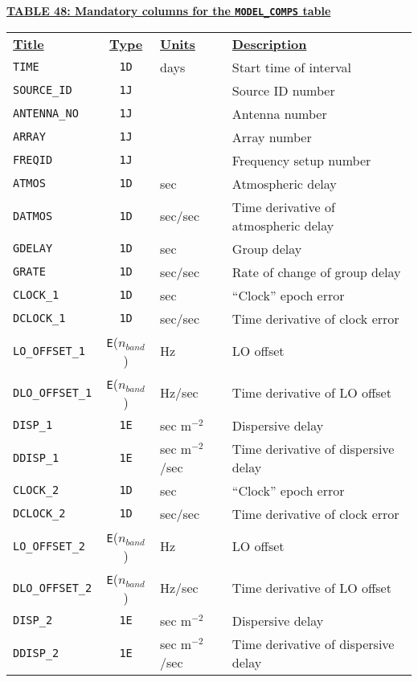 \documentclass[twoside]{article}
\newcommand{\Me}[1]{\textcolor{mecol}{#1}}
\newcommand{\nband}{$n_{band}$}
\begin{document}
\begin{center}
\underline{\bf{TABLE 48: Mandatory columns for the {\tt MODEL\_COMPS}
    table}}\\
\begin{tabular}{lcll}
\noalign{\vspace{2pt}}
\underline{{\bf Title\vphantom{y}}} & \underline{\bf{Type}} &
   \underline{{\bf Units\vphantom{y}}} & \underline{\bf{Description}} \\
\noalign{\vspace{2pt}}
{\tt TIME}        & {\tt 1D} & days  & \Me{Start} time of interval \\
{\tt SOURCE\_ID}  & {\tt 1J} &       & Source ID number \\
{\tt ANTENNA\_NO} & {\tt 1J} &       & Antenna number \\
{\tt ARRAY}       & {\tt 1J} &       & Array number \\
{\tt FREQID}      & {\tt 1J} &       & Frequency setup number \\
{\tt ATMOS}       & {\tt 1D} & sec   & Atmospheric delay \\
{\tt DATMOS}      & {\tt 1D} & sec/sec & Time derivative of
                                       atmospheric delay \\
{\tt GDELAY}      & {\tt 1D} & sec   & Group delay \\
{\tt GRATE}       & {\tt 1D} & sec/sec & Rate of change of group delay \\
{\tt CLOCK\_1}    & {\tt 1D} & sec   & ``Clock'' epoch error \\
{\tt DCLOCK\_1}   & {\tt 1D} & sec/sec & Time derivative of clock error \\
{\tt LO\_OFFSET\_1} & {\tt E}(\nband) & Hz & LO offset \\
{\tt DLO\_OFFSET\_1} & {\tt E}(\nband) & Hz/sec & Time derivative of
                                        LO offset \\
{\tt DISP\_1}     & {\tt 1E} & sec \Me{m$^{-2}$} & Dispersive delay \\
{\tt DDISP\_1}    & {\tt 1E} & sec \Me{m$^{-2}$}/sec & Time derivative of dispersive
                                        delay \\
\hline
{\tt CLOCK\_2}    & {\tt 1D} & sec   & ``Clock'' epoch error \\
{\tt DCLOCK\_2}   & {\tt 1D} & sec/sec & Time derivative of clock error \\
{\tt LO\_OFFSET\_2} & {\tt E}(\nband) & Hz & LO offset \\
{\tt DLO\_OFFSET\_2} & {\tt E}(\nband) & Hz/sec & Time derivative of
                                        LO offset \\
{\tt DISP\_2}     & {\tt 1E} & sec \Me{m$^{-2}$} & Dispersive delay \\
{\tt DDISP\_2}    & {\tt 1E} & sec \Me{m$^{-2}$}/sec & Time derivative of dispersive
                                        delay \\
\end{tabular}
\end{center}
\end{document}
